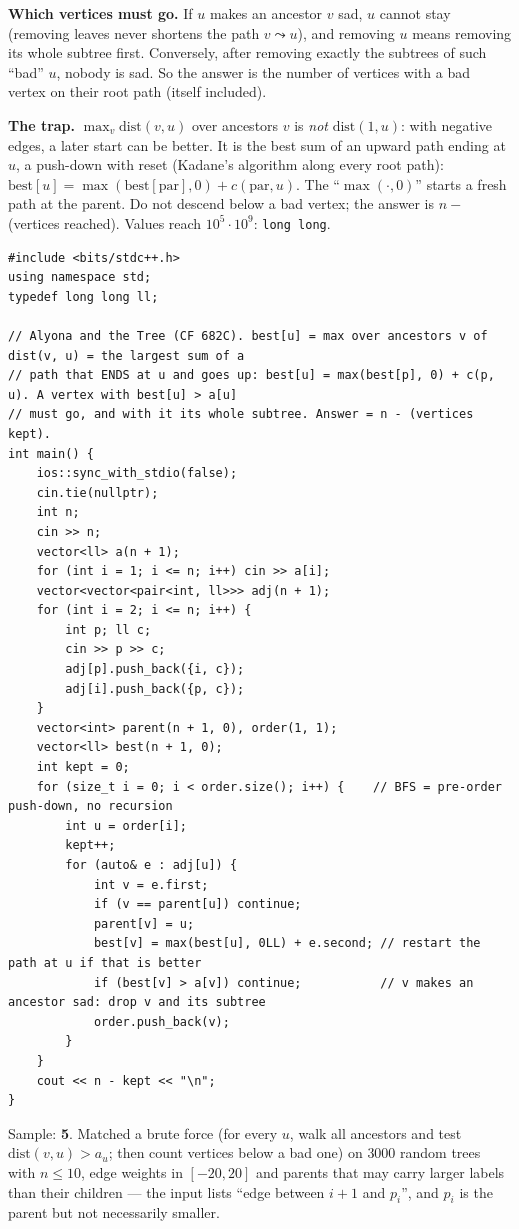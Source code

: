 \begin{solutionbox}
\textbf{Which vertices must go.} If $u$ makes an ancestor $v$ sad, $u$ cannot stay (removing leaves never shortens the path $v \leadsto u$), and removing $u$ means removing its whole subtree first. Conversely, after removing exactly the subtrees of such ``bad'' $u$, nobody is sad. So the answer is the number of vertices with a bad vertex on their root path (itself included).

\textbf{The trap.} $\max_v \mathrm{dist}(v, u)$ over ancestors $v$ is \emph{not} $\mathrm{dist}(1, u)$: with negative edges, a later start can be better. It is the best sum of an upward path ending at $u$, a push-down with reset (Kadane's algorithm along every root path): $\mathrm{best}[u] = \max(\mathrm{best}[\mathrm{par}], 0) + c(\mathrm{par}, u)$. The ``$\max(\cdot, 0)$'' starts a fresh path at the parent. Do not descend below a bad vertex; the answer is $n - $ (vertices reached). Values reach $10^5 \cdot 10^9$: \texttt{long long}.
\begin{lstlisting}[style=cpp]
#include <bits/stdc++.h>
using namespace std;
typedef long long ll;

// Alyona and the Tree (CF 682C). best[u] = max over ancestors v of dist(v, u) = the largest sum of a
// path that ENDS at u and goes up: best[u] = max(best[p], 0) + c(p, u). A vertex with best[u] > a[u]
// must go, and with it its whole subtree. Answer = n - (vertices kept).
int main() {
    ios::sync_with_stdio(false);
    cin.tie(nullptr);
    int n;
    cin >> n;
    vector<ll> a(n + 1);
    for (int i = 1; i <= n; i++) cin >> a[i];
    vector<vector<pair<int, ll>>> adj(n + 1);
    for (int i = 2; i <= n; i++) {
        int p; ll c;
        cin >> p >> c;
        adj[p].push_back({i, c});
        adj[i].push_back({p, c});
    }
    vector<int> parent(n + 1, 0), order(1, 1);
    vector<ll> best(n + 1, 0);
    int kept = 0;
    for (size_t i = 0; i < order.size(); i++) {    // BFS = pre-order push-down, no recursion
        int u = order[i];
        kept++;
        for (auto& e : adj[u]) {
            int v = e.first;
            if (v == parent[u]) continue;
            parent[v] = u;
            best[v] = max(best[u], 0LL) + e.second; // restart the path at u if that is better
            if (best[v] > a[v]) continue;           // v makes an ancestor sad: drop v and its subtree
            order.push_back(v);
        }
    }
    cout << n - kept << "\n";
}
\end{lstlisting}
Sample: \textbf{5}. Matched a brute force (for every $u$, walk all ancestors and test $\mathrm{dist}(v,u) > a_u$; then count vertices below a bad one) on $3000$ random trees with $n \le 10$, edge weights in $[-20, 20]$ and parents that may carry larger labels than their children --- the input lists ``edge between $i+1$ and $p_i$'', and $p_i$ is the parent but not necessarily smaller.
\end{solutionbox}


